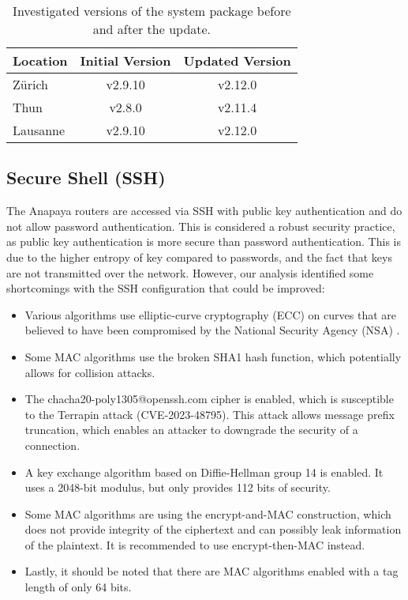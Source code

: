 \begin{table}[h]
    \centering
    \begin{tabular}{|l|c|c|}
        \hline
        \textbf{Location} & \textbf{Initial Version} & \textbf{Updated Version} \\
        \hline
        Zürich & v2.9.10 & v2.12.0 \\
        \hline
        Thun & v2.8.0 & v2.11.4\\
        \hline
        Lausanne & v2.9.10 & v2.12.0\\
        \hline
    \end{tabular}
    \caption{Investigated versions of the system package before and after the update.}
    \label{tab:system_software_versions}
\end{table}



\subsection{Secure Shell (SSH)}
\label{sec:ssh}
The Anapaya routers are accessed via SSH with public key authentication and do not allow password authentication.
This is considered a robust security practice, as public key authentication is more secure than password authentication.
This is due to the higher entropy of key compared to passwords, and the fact that keys are not transmitted over the network.
However, our analysis identified some shortcomings with the SSH configuration that could be improved:
\newpage
\begin{itemize}
    \item Various algorithms use elliptic-curve cryptography (ECC) on curves that are believed to have been compromised by the National Security Agency (NSA) \cite{nist1_safecurves}.
    \item Some MAC algorithms use the broken SHA1 hash function, which potentially allows for collision attacks.
    \item The chacha20-poly1305@openssh.com cipher is enabled, which is susceptible to the Terrapin attack (CVE-2023-48795).
    This attack allows message prefix truncation, which enables an attacker to downgrade the security of a connection.
    \item A key exchange algorithm based on Diffie-Hellman group 14 is enabled. It uses a 2048-bit modulus, but only provides 112 bits of security.
    \item Some MAC algorithms are using the encrypt-and-MAC construction, which does not provide integrity of the ciphertext and can possibly leak information of the plaintext.
    It is recommended to use encrypt-then-MAC instead.
    \item Lastly, it should be noted that there are MAC algorithms enabled with a tag length of only 64 bits.
\end{itemize}

